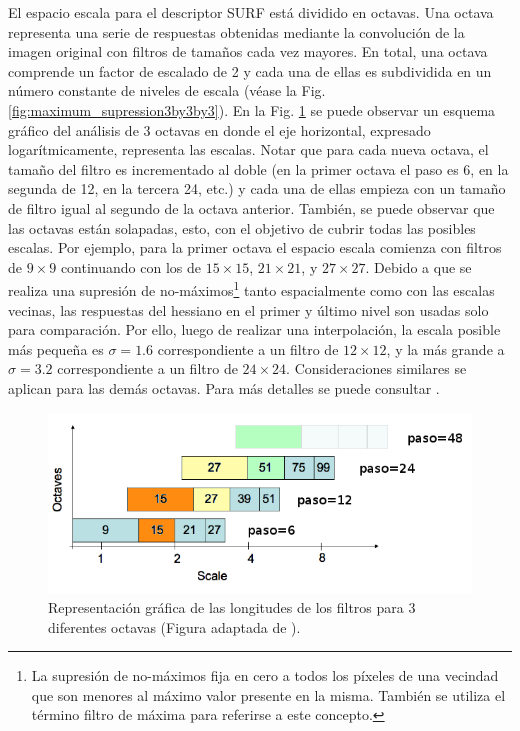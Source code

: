       El espacio escala para el descriptor SURF está dividido en octavas. Una octava representa una serie de respuestas obtenidas mediante la convolución de la imagen original con filtros de tamaños cada vez mayores. En total, una octava comprende un factor de escalado de 2 y cada una de ellas es subdividida en un número constante de niveles de escala (véase la Fig. \ref{fig:maximum_supression3by3by3}).
 En la Fig. \ref{fig:tamfilters1} se puede observar un esquema gráfico del análisis de 3 octavas en donde el eje horizontal, expresado logarítmicamente, representa las escalas. Notar que para cada nueva octava, el tamaño del filtro es incrementado al doble (en la primer octava el paso es 6, en la segunda de 12, en la tercera 24, etc.) y cada una de ellas empieza con un tamaño de filtro igual al segundo de la octava anterior. También, se puede observar que las octavas están solapadas, esto, con el objetivo de cubrir todas las posibles escalas. %
 Por ejemplo, para la primer octava el espacio escala comienza con filtros de $9 \times 9$ continuando con los de $15 \times 15$, $21 \times 21$, y $27 \times 27$. Debido a que se realiza una supresión de no-máximos\footnote{La supresión de no-máximos fija en cero a todos los píxeles de una vecindad que son menores al máximo valor presente en la misma. También se utiliza el término filtro de máxima para referirse a este concepto.} tanto espacialmente como con las escalas vecinas, las respuestas del hessiano en el primer y último nivel son usadas solo para comparación. Por ello, luego de realizar una interpolación, la escala posible más pequeña es $\sigma = 1.6$ correspondiente a un filtro de $12 \times 12$, y la más grande a $\sigma = 3.2$ correspondiente a un filtro de $24 \times 24$. Consideraciones similares se aplican para las demás octavas. Para más detalles se puede consultar \cite{DBLP:phd/ch/Bay2009}.
      \begin{figure}[tbhp]
	\centering
	      \includegraphics[scale=0.32]{./figs/tamfilters1}
	  \caption[Longitudes de los filtros para 3 diferentes octavas]{Representación gráfica de las longitudes de los filtros para 3 diferentes octavas (Figura adaptada de \cite{Bay:2008:SRF}).}
	\label{fig:tamfilters1}               %
      \end{figure}
